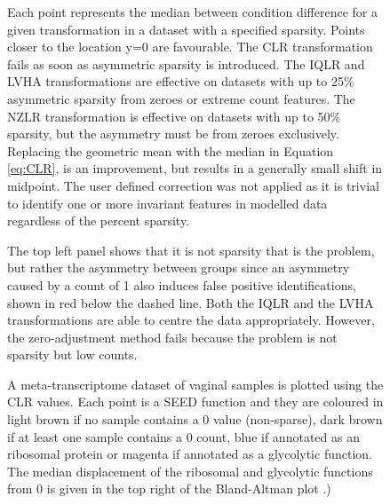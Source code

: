 \documentclass{bmcart}
\def\texttt{[image: ]}
\begin{document}
\begin{backmatter}
\begin{figure}[h!]
\caption{ Each point represents the median between condition difference for a given transformation in a dataset with a specified sparsity. Points closer to the location y=0 are favourable. The CLR transformation fails as soon as asymmetric sparsity is introduced. The IQLR and LVHA transformations are effective on datasets with up to 25\% asymmetric sparsity from zeroes or extreme count features. The NZLR transformation is effective on datasets with up to 50\% sparsity, but the asymmetry must be from zeroes exclusively. Replacing the geometric mean with the median in Equation \ref{eq:CLR}, is an improvement, but results in a generally small shift in midpoint. The user defined correction was not applied as it is trivial to identify one or more invariant features in modelled data regardless of the percent sparsity.}
\label{Fig:failure}
\end{figure}

\begin{figure}[!t]
\caption{ The top left panel shows that it is not sparsity that is the problem, but rather the asymmetry  between groups since an asymmetry caused by a count of 1 also induces false positive identifications, shown in red below the dashed line. Both the IQLR and the LVHA transformations are able to centre the data appropriately. However, the zero-adjustment method fails because the problem is not sparsity but low counts.}
\label{Fig:ones}
\end{figure}

\begin{figure}[h!]
\caption{ A meta-transcriptome dataset of vaginal samples is plotted using the CLR values. Each point is a SEED function \cite{Mitra:2011} and they are coloured in light brown if no sample contains a 0 value (non-sparse), dark brown if at least one sample contains a 0 count, blue if annotated as an ribosomal protein or magenta if annotated as a glycolytic function. The median displacement of the ribosomal and glycolytic functions from 0 is given in the top right of the Bland-Altman plot \cite{altman:1983}.) }
\label{Fig:bv}
\end{figure}



\end{backmatter}
\end{document}
